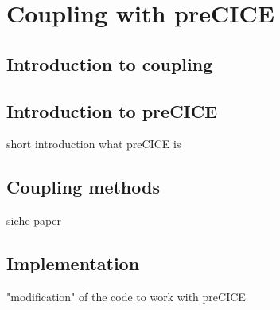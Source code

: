 \section{Coupling with preCICE} %



 \subsection{Introduction to coupling}




 \subsection{Introduction to preCICE}
 short introduction what preCICE is



 \subsection{Coupling methods}
  siehe paper



 \subsection{Implementation}
 "modification" of the code to work with preCICE
\newpage